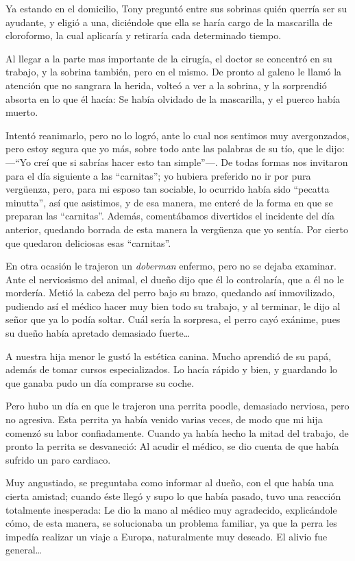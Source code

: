 \documentclass[letterpaper, 12pt]{book}
\begin{document}
Ya estando en el domicilio, Tony preguntó entre sus sobrinas quién querría ser su ayudante, y eligió a una, diciéndole que ella se haría cargo  de la mascarilla de cloroformo, la cual aplicaría y retiraría cada determinado tiempo.

Al llegar a la parte mas importante de la cirugía, el doctor se concentró en su trabajo, y la sobrina también, pero en el mismo. De pronto al galeno le llamó la atención que no sangrara la herida, volteó a ver a la sobrina, y la sorprendió absorta en lo que él hacía: Se había olvidado de la mascarilla, y el puerco había muerto.

Intentó reanimarlo, pero no lo logró, ante lo cual nos sentimos muy avergonzados, pero estoy segura que yo más, sobre todo ante las palabras de su tío, que le dijo: ---``Yo creí que si sabrías hacer esto tan simple''---. De todas formas nos invitaron para el día siguiente a las ``carnitas''; yo hubiera preferido no ir por pura vergüenza, pero, para mi esposo tan sociable, lo ocurrido había sido ``pecatta minutta'', así que asistimos, y de esa manera, me enteré de la forma en que se preparan las ``carnitas''. Además, comentábamos divertidos el incidente del día anterior, quedando borrada de esta manera la vergüenza que yo sentía. Por cierto que quedaron deliciosas esas ``carnitas''.

En otra ocasión le trajeron un \textit{doberman} enfermo, pero no se dejaba examinar. Ante el nerviosismo del animal, el dueño dijo que él lo controlaría, que a él no le mordería. Metió la cabeza del perro bajo su brazo, quedando así inmovilizado, pudiendo así el médico hacer muy bien todo su trabajo, y al terminar, le dijo al señor que ya lo podía soltar. Cuál sería la sorpresa, el perro cayó exánime, pues su dueño había apretado demasiado fuerte\ldots


A nuestra hija menor le gustó la estética canina. Mucho aprendió de su papá, además de tomar cursos especializados. Lo hacía rápido y bien, y guardando lo que ganaba pudo un día comprarse su coche.

Pero hubo un día en que le trajeron una perrita poodle, demasiado nerviosa, pero no agresiva. Esta perrita ya había venido varias veces, de modo que mi hija comenzó su labor confiadamente. Cuando ya había hecho la mitad del trabajo, de pronto la perrita se desvaneció: Al acudir el médico, se dio cuenta de que había sufrido un paro cardiaco. 

Muy angustiado, se preguntaba como informar al dueño, con el que había una cierta amistad; cuando éste llegó y supo lo que había pasado, tuvo una reacción totalmente inesperada: Le dio la mano al médico muy agradecido, explicándole cómo, de esta manera, se solucionaba un problema familiar, ya que la perra les impedía realizar un viaje a Europa, naturalmente muy deseado. El alivio fue general\ldots
\end{document}
